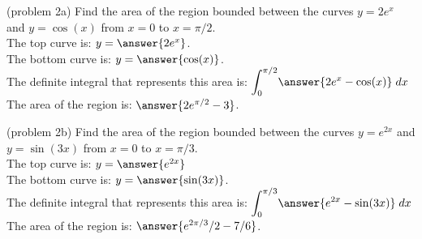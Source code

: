 \documentclass[handout]{ximera}
\begin{document}
\begin{problem}(problem 2a)
Find the area of the region bounded between the curves $y = 2e^x$ and $y = \cos(x)$ from $x = 0$ to $x = \pi/2$.\\
The top curve is: $y = \answer{2e^x}$.\\
The bottom curve is: $y = \answer{\cos(x)}$.\\
The definite integral that represents this area is: $\displaystyle{\int_0^{\pi/2}} \answer{2e^x - \cos(x)} \; dx$\\
The area of the region is: $\answer{2e^{\pi/2} - 3}$.
\end{problem}


\begin{problem}(problem 2b)
Find the area of the region bounded between the curves $y = e^{2x}$ and $y = \sin(3x)$ from $x = 0$ to $x = \pi/3$.\\
The top curve is: $y = \answer{e^{2x}}$\\
The bottom curve is: $y = \answer{\sin(3x)}$.\\
The definite integral that represents this area is: $\displaystyle{\int_0^{\pi/3}} \answer{e^{2x} - \sin(3x)} \; dx$\\
The area of the region is: $\answer{e^{2\pi/3}/2 - 7/6}$.
\end{problem}



 
\end{document}
